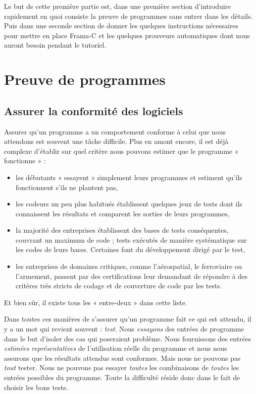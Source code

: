 \documentclass[12pt,francais,]{scrbook}
\providecommand{\tightlist}{%
  \setlength{\itemsep}{0pt}\setlength{\parskip}{0pt}}
\begin{document}
Le but de cette première partie est, dans une première section
d'introduire rapidement en quoi consiste la preuve de programmes sans
entrer dans les détails. Puis dans une seconde section de donner les
quelques instructions nécessaires pour mettre en place Frama-C et les
quelques prouveurs automatiques dont nous auront besoin pendant le
tutoriel.

\section{Preuve de programmes}\label{preuve-de-programmes}

\subsection{Assurer la conformité des
logiciels}\label{assurer-la-conformituxe9-des-logiciels}

Assurer qu'un programme a un comportement conforme à celui que nous
attendons est souvent une tâche difficile. Plus en amont encore, il est
déjà complexe d'établir sur quel critère nous pouvons estimer que le
programme « fonctionne » :

\begin{itemize}
\tightlist
\item
  les débutants « essayent » simplement leurs programmes et estiment
  qu'ils fonctionnent s'ils ne plantent pas,
\item
  les codeurs un peu plus habitués établissent quelques jeux de tests
  dont ils connaissent les résultats et comparent les sorties de leurs
  programmes,
\item
  la majorité des entreprises établissent des bases de tests
  conséquentes, couvrant un maximum de code ; tests exécutés de manière
  systématique sur les codes de leurs bases. Certaines font du
  développement dirigé par le test,
\item
  les entreprises de domaines critiques, comme l'aérospatial, le
  ferroviaire ou l'armement, passent par des certifications leur
  demandant de répondre à des critères très stricts de codage et de
  couverture de code par les tests.
\end{itemize}

Et bien sûr, il existe tous les « entre-deux » dans cette liste.

Dans toutes ces manières de s'assurer qu'un programme fait ce qui est
attendu, il y a un mot qui revient souvent : \emph{test}. Nous
\emph{essayons} des entrées de programme dans le but d'isoler des cas
qui poseraient problème. Nous fournissons des entrées \emph{estimées
représentatives} de l'utilisation réelle du programme et nous nous
assurons que les résultats attendus sont conformes. Mais nous ne pouvons
pas \emph{tout} tester. Nous ne pouvons pas essayer \emph{toutes} les
combinaisons de \emph{toutes} les entrées possibles du programme. Toute
la difficulté réside donc dans le fait de choisir les bons tests.
\end{document}
